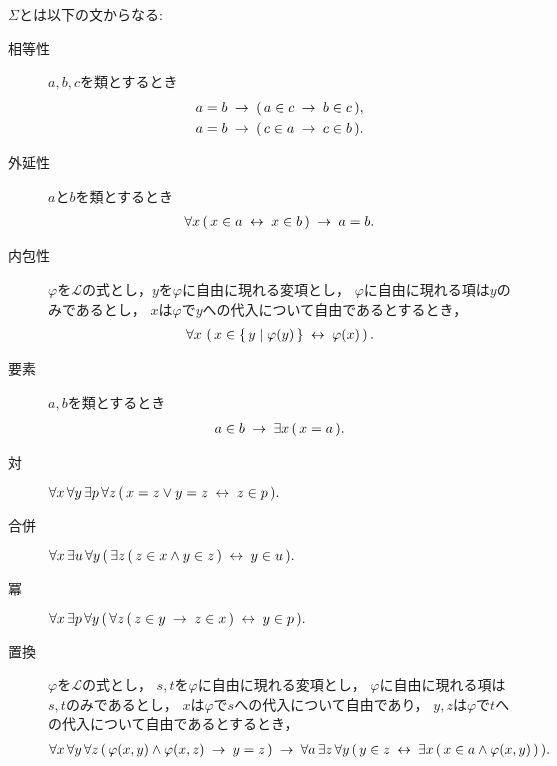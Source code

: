	$\Sigma$とは以下の文からなる:
	\begin{description}
		\item[相等性] $a,b,c$を類とするとき
			\begin{align}
				&a = b \hspace{0.25em}\rightarrow\hspace{0.25em} (\, a \in c \hspace{0.25em}\rightarrow\hspace{0.25em} b \in c\, ), \\
				&a = b \hspace{0.25em}\rightarrow\hspace{0.25em} (\, c \in a \hspace{0.25em}\rightarrow\hspace{0.25em} c \in b\, ).
			\end{align}
			
		\item[外延性] $a$と$b$を類とするとき
			\begin{align}
				\forall x\, (\, x \in a \hspace{0.25em}\leftrightarrow\hspace{0.25em} x \in b\, ) \hspace{0.25em}\rightarrow\hspace{0.25em} a = b.
			\end{align}
			
		\item[内包性] $\varphi$を$\mathcal{L}$の式とし，$y$を$\varphi$に自由に現れる変項とし，
			$\varphi$に自由に現れる項は$y$のみであるとし，
			$x$は$\varphi$で$y$への代入について自由であるとするとき，
			\begin{align}
				\forall x\, \left(\, x \in \left\{\, y \mid \varphi(y)\, \right\} \hspace{0.25em}\leftrightarrow\hspace{0.25em} \varphi(x)\, \right).
			\end{align}
		
		\item[要素] $a,b$を類とするとき
			\begin{align}
				a \in b \hspace{0.25em}\rightarrow\hspace{0.25em} \exists x\, (\, x = a\, ).
			\end{align}
			
		\item[対] $\forall x\, \forall y\, \exists p\, \forall z\, 
			(\, x = z \vee y = z \hspace{0.25em}\leftrightarrow\hspace{0.25em} z \in p\, ).$
			
		\item[合併] $\forall x\, \exists u\, \forall y\, (\, \exists z\, (\, z \in x \wedge y \in z\, ) \hspace{0.25em}\leftrightarrow\hspace{0.25em} y \in u\, ).$
			
		\item[冪] $\forall x\, \exists p\, \forall y\, 
			(\, \forall z\, (\, z \in y \hspace{0.25em}\rightarrow\hspace{0.25em} z \in x\, ) \hspace{0.25em}\leftrightarrow\hspace{0.25em} y \in p\, ).$
			
		\item[置換] $\varphi$を$\mathcal{L}$の式とし，
			$s,t$を$\varphi$に自由に現れる変項とし，
			$\varphi$に自由に現れる項は$s,t$のみであるとし，
			$x$は$\varphi$で$s$への代入について自由であり，
			$y,z$は$\varphi$で$t$への代入について自由であるとするとき，
			\begin{align}
				\forall x\, \forall y\, \forall z\, 
				(\, \varphi(x,y) \wedge \varphi(x,z)
				\hspace{0.25em}\rightarrow\hspace{0.25em} y = z\, )
				\hspace{0.25em}\rightarrow\hspace{0.25em} \forall a\, \exists z\, \forall y\,
				(\, y \in z \hspace{0.25em}\leftrightarrow\hspace{0.25em} \exists x\, (\, x \in a \wedge 
				\varphi(x,y)\, )\, ).
			\end{align}
			

\end{description}
